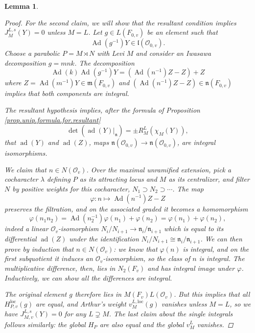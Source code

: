 \documentclass[openany]{amsbook}
\newtheorem{lemma}[theorem]{Lemma}
\theoremstyle{definition}
\theoremstyle{remark}
\numberwithin{equation}{section}
\renewcommand{\O}{\mathcal{O}}
\renewcommand{\phi}{\varphi}
\renewcommand{\-}{\operatorname{-}}
\newcommand{\on}[1]{\operatorname{#1}}
\newcommand{\fm}{\mathfrak{m}}
\newcommand{\fn}{\mathfrak{n}}
\newcommand{\fl}{\mathfrak{l}}
\renewcommand{\fm}{\mathfrak{m}}
\newcommand{\Ad}{\on{Ad}}
\newcommand{\ad}{\on{ad}}
\newcommand{\loc}{\mathrm{loc}}
\begin{document}
\begin{lemma}
\begin{proof}
        For the second claim, we will show that the resultant condition implies 
        $J_{M}^{L,s}(Y) = 0$ unless $M = L$. Let $g \in L(F_{0,v})$ be an element such that 
        $$
            \Ad(g^{-1}) Y \in \fl(\O_{0,v}). 
        $$
        Choose a parabolic $P = M \rtimes N$ with Levi $M$ and consider an Iwasawa decomposition $g = mnk$. The decomposition 
        $$
            \Ad(k) \Ad(g^{-1}) Y = (\Ad(n^{-1}) Z - Z) + Z
        $$
        where $Z = \Ad(m^{-1})Y \in \fm(F_{0,v})$ and $(\Ad(n^{-1}) Z - Z) \in \fn(F_{0,v})$ implies that both components are integral. 

        The resultant hypothesis implies, after the formula of Proposition \ref{prop.unip.formula.for.resultant}
        $$
            \det(\ad(Y)|_{\fn}) = \pm R_M^L(\chi_M(Y)),
        $$
        that $\ad(Y)$ and $\ad(Z)$, maps $\fn(\O_{0,v}) \to \fn(\O_{0,v})$, are integral isomorphisms. 

        We claim that $n \in N(\O_v)$. Over the maximal unramified extension, pick a cocharacter $\lambda$ defining $P$ as its attracting locus and $M$ as its centralizer, and filter $N$ by positive weights for this cocharacter, $N_1 \supset N_2 \supset \cdots$. The map
        $$
            \phi : n \mapsto \Ad(n^{-1})Z - Z
        $$
        preserves the filtration, and on the associated graded it becomes a homomorphism
        $$
            \phi(n_1 n_2) = \Ad(n_2^{-1}) \phi(n_1) + \phi(n_2) = \phi(n_1) + \phi(n_2),
        $$
        indeed a linear $\O_v$-isomorphism $N_i/N_{i+1} \to \fn_i/\fn_{i+1}$ which is equal to its differential $\ad(Z)$ under the identification $N_i/N_{i+1} \cong \fn_i/\fn_{i+1}$. We can then prove by induction that $n \in N(\O_v)$: we know that $\phi(n)$ is integral, and on the first subquotient it induces an $\O_v$-isomorphism, so the class of $n$ is integral. The multiplicative difference, then, lies in $N_2(F_v)$ and has integral image under $\phi$. Inductively, we can show all the differences are integral.
        
        The original element $g$ therefore lies in $M(F_{v}) L(\O_{v})$. But this implies that all $H_{P,v}^{\loc}(g)$ are equal, and Arthur's weight $v_M^{L,\loc}(g)$ vanishes unless $M = L$, so we have $J^{L,s}_{M,v}(Y) = 0$ for any $L \supsetneq M$. The last claim about the single integrals follows similarly: the global $H_P$ are also equal and the global $v_M^L$ vanishes.
    \end{proof}
\end{lemma}
\end{document}
